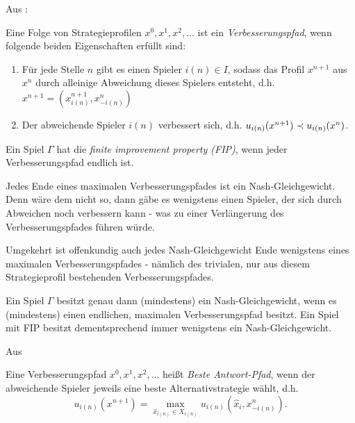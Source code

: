 Aus \cite{MonShap}:

\begin{defn}
	Eine Folge von Strategieprofilen $x^0, x^1, x^2, \dots$ ist ein \emph{Verbesserungspfad}, wenn folgende beiden Eigenschaften erfüllt sind:
	\begin{enumerate}
		\item Für jede Stelle $n$ gibt es einen Spieler $i(n) \in I$, sodass das Profil $x^{n+1}$ aus $x^n$ durch alleinige Abweichung dieses Spielers entsteht, d.h. $x^{n+1} = (x^{n+1}_{i(n)}, x^n_{-i(n)})$
		\item Der abweichende Spieler $i(n)$ verbessert sich, d.h. $u_{i(n)}(x^{n+1}) \prec u_{i(n)}(x^n)$.
	\end{enumerate}
\end{defn}

\begin{defn}
	Ein Spiel $\Gamma$ hat die \emph{finite improvement property (FIP)}, wenn jeder Verbesserungspfad endlich ist.
\end{defn}

\begin{beob}\label{beob:VerbPfadeundNGe}
	Jedes Ende eines maximalen Verbesserungspfades ist ein Nash-Gleichgewicht. Denn wäre dem nicht so, dann gäbe es wenigstens einen Spieler, der sich durch Abweichen noch verbessern kann - was zu einer Verlängerung des Verbesserungspfades führen würde. 
		
	Umgekehrt ist offenkundig auch jedes Nash-Gleichgewicht Ende wenigstens eines maximalen Verbesserungspfades - nämlich des trivialen, nur aus diesem Strategieprofil bestehenden Verbesserungspfades.
\end{beob}

\begin{kor}\label{kor:ExVerbPfadExNG}
	Ein Spiel $\Gamma$ besitzt genau dann (mindestens) ein Nash-Gleichgewicht, wenn es (mindestens) einen endlichen, maximalen Verbesserungspfad besitzt. Ein Spiel mit FIP besitzt dementsprechend immer wenigstens ein Nash-Gleichgewicht.
\end{kor}

Aus \cite{BestRespPot}

\begin{defn}
	Eine Verbesserungspfad $x^0, x^1, x^2, \dots$ heißt \emph{Beste Antwort-Pfad}, wenn der abweichende Spieler jeweils eine beste Alternativstrategie wählt, d.h. 
		\[u_{i(n)}(x^{n+1}) = \max_{\hat{x}_{i(n)} \in X_{i(n)}} u_{i(n)}(\hat{x}_i,x^n_{-i(n)}).\]
\end{defn}